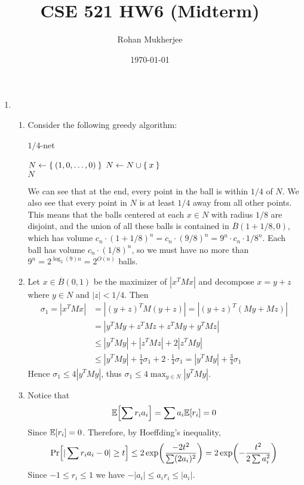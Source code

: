 \documentclass[12pt]{article}
\title{CSE 521 HW6 (Midterm)}
\date{\today}
\author{Rohan Mukherjee}
\theoremstyle{definitionstyle}
\renewcommand{\P}{\mathrm{Pr}\qty}
\newcommand{\E}{\mathbb{E}\qty}
\begin{document}
	\maketitle
	\begin{enumerate}[leftmargin=\labelsep]
		\item 
		\begin{enumerate}
			\item Consider the following greedy algorithm:
			\begin{algorithm}
				\caption{$1/4$-net}
				\begin{algorithmic}
					\State $N \gets \Set{(1, 0, \ldots, 0)}$
						\State $N \gets N \cup \Set{x}$
					\EndWhile \\
					\Return $N$
				\end{algorithmic}
			\end{algorithm}
		
			We can see that at the end, every point in the ball is within $1/4$ of $N$. We also see that every point in $N$ is at least $1/4$ away from all other points. This means that the balls centered at each $x \in N$ with radius $1/8$ are disjoint, and the union of all these balls is contained in $\overline B(1+1/8, 0)$, which has volume $c_n \cdot (1+1/8)^n = c_n \cdot (9/8)^n = 9^n \cdot c_n \cdot 1/8^n$. Each ball has volume $c_n \cdot (1/8)^n$, so we must have no more than $9^n = 2^{\log_2(9)n} = 2^{O(n)}$ balls.
			
			\item Let $x \in \overline B(0, 1)$ be the maximizer of $|x^TMx|$ and decompose $x = y + z$ where $y \in N$ and $|z| < 1/4$. Then
			\begin{align*}
				\sigma_1 = |x^TMx| &= |(y+z)^TM(y+z)| = |(y+z)^T(My+Mz)| \\
				&= |y^TMy + z^TMz + z^TMy + y^TMz| \\
				&\leq |y^TMy| + |z^TMz| + 2|z^TMy| \\
				&\leq |y^TMy| + \frac14 \sigma_1 + 2 \cdot \frac14 \sigma_1 = |y^TMy| + \frac34 \sigma_1
			\end{align*}
			Hence $\sigma_1 \leq 4|y^TMy|$, thus $\sigma_1 \leq 4\max_{y \in N} |y^TMy|$.
			
			\item Notice that
			\begin{align*}
				\E[\sum r_ia_i] = \sum a_i \E[r_i] = 0
			\end{align*}
			Since $\E[r_i] = 0$. Therefore, by Hoeffding's inequality,
			\begin{align*}
				\P[|\sum r_ia_i - 0| \geq t] \leq 2\exp(\frac{-2t^2}{\sum (2a_i)^2}) = 2\exp(-\frac{t^2}{2\sum a_i^2})
			\end{align*}
			Since $-1 \leq r_i \leq 1$ we have $-|a_i| \leq a_ir_i \leq |a_i|$.
			

\end{enumerate}
\end{enumerate}
\end{document}
